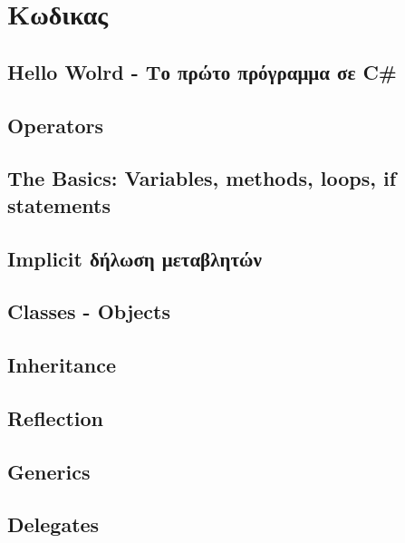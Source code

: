 \section{Κωδικας}

\subsection{Hello Wolrd - Το πρώτο πρόγραμμα σε C\#}
\label{Hello World}


\subsection{Operators}
\label{Operators}


\subsection{The Basics: Variables, methods, loops, if statements}
\label{Basics}


\subsection{Implicit δήλωση μεταβλητών}
\label{implicitdeclaration}


\subsection{Classes - Objects}
\label{Classes - Objects}


\subsection{Inheritance}
\label{inheritance}


\subsection{Reflection}
\label{reflection}


\subsection{Generics}
\label{generics}


\subsection{Delegates}
\label{delegates}


